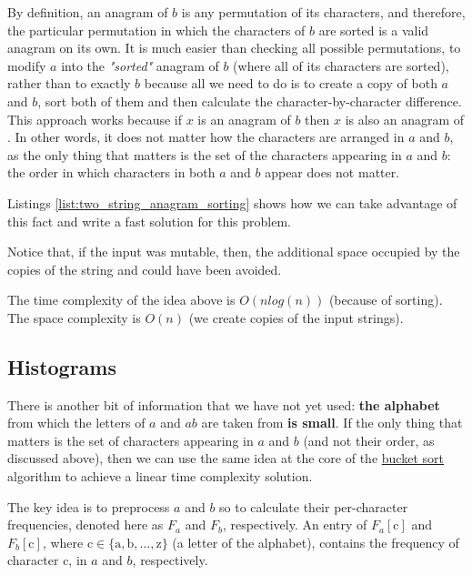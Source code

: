 By definition, an anagram of $b$ is any permutation of its characters, and therefore, the particular permutation in which the characters of $b$ are sorted is a valid anagram on its own. 
It is much easier than checking all possible permutations, to modify $a$ into the \textit{"sorted"} anagram of $b$ (where all of its characters are sorted), rather than to exactly $b$ because all we need to do is to create a copy of both $a$ and $b$, sort both of them and then calculate the character-by-character difference.
This approach works because if $x$ is an anagram of $b$ then $x$ is also an
anagram of .
In other words, it does not matter how the characters are arranged in $a$ and $b$, as the only thing that matters is the set of the characters appearing in $a$ and $b$: the order in which characters in both $a$ and $b$ appear does not matter.

Listings \ref{list:two_string_anagram_sorting}  shows how we can take advantage of this fact and write a fast solution for this problem.

 	

Notice that, if the input was mutable, then, the additional space occupied by the copies of the string  and could have been avoided. 
	 
The time complexity of the idea above is $O(n log(n))$ (because of sorting). The space complexity is $O(n)$ (we create copies of the input strings).
	   

\subsection{Histograms}
\label{sec:anagrams:histograms}

There is another bit of information that we have not  yet used: \textbf{the alphabet} from which the
letters of $a$ and $ab$ are taken from \textbf{is small}. 
If the only thing that matters is the set of characters appearing in $a$ and $b$ (and not their order, as discussed above), then we can use the same idea at the core of the \href{https://en.wikipedia.org/wiki/Bucket_sort}{bucket sort} algorithm to achieve a linear time complexity solution.

The key idea is to preprocess $a$ and $b$ so to calculate their per-character frequencies, denoted here as $F_a$ and $F_b$, respectively. An entry of $F_a[\mathrm{c}]$ and $F_b[\mathrm{c}]$, where $\mathrm{c} \in \{\mathrm{a},\mathrm{b},\ldots,\mathrm{z}\}$ (a letter of the alphabet), contains the frequency of character $\mathrm{c}$, in $a$ and $b$, respectively.

